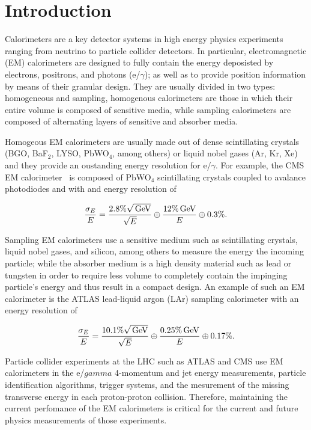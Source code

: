\section{Introduction}
Calorimeters are a key detector systems in high energy physics experiments
ranging from neutrino to particle collider detectors. In
particular, electromagnetic (EM) calorimeters are designed to fully
contain the energy deposisted by electrons, positrons, and photons (e/$\gamma$);
as well as to provide position information by means of their granular
design. They are usually divided in two types: homogeneous and
sampling, homogenous calorimeters are those in which their entire
volume is composed of sensitive media, while sampling calorimeters
are composed of alternating layers of sensitive and absorber
media. 

Homogeous EM calorimeters are usually made out of dense scintillating
crystals (BGO, BaF$_{2}$, LYSO, PbWO$_{4}$, among others) or liquid nobel gases
(Ar, Kr, Xe) and they provide an oustanding energy resolution for
e/$\gamma$. For example, the CMS EM calorimeter~\cite{cmsECAL} is
composed of PbWO$_{4}$ scintillating crystals coupled to avalance
photodiodes and with and energy resolution of

\begin{equation}
\frac{\sigma_{E}}{E} = \frac{2.8\%\sqrt{\,\text{Ge\hspace{-.08em}V}}}{\sqrt{E}} \oplus \frac{12\%\,\text{Ge\hspace{-.08em}V}}{E} \oplus 0.3\%.
\end{equation}

Sampling EM calorimeters use a sensitive medium such as
scintillating crystals, liquid nobel gases, and silicon, among others
to measure the energy the incoming particle;
while the absorber medium is a high density material such as lead or
tungsten in order to require less volume to completely contain the
impinging particle's energy and thus result in a compact design. An
example of such an EM calorimeter is the ATLAS lead-liquid argon (LAr)
sampling calorimeter with an energy resolution of

\begin{equation}
\frac{\sigma_{E}}{E} = \frac{10.1\%\sqrt{\,\text{Ge\hspace{-.08em}V}}}{\sqrt{E}} \oplus \frac{0.25\%\,\text{Ge\hspace{-.08em}V}}{E} \oplus 0.17\%.
\end{equation}

Particle collider experiments at the LHC such as ATLAS and CMS
use EM calorimeters in the e/$gamma$ 4-momentum and jet
energy measurements, particle identification algorithms,
trigger systems, and the mesurement of the missing transverse energy in
each proton-proton collision. Therefore, maintaining the current perfomance of the EM
calorimeters is critical for the current and future physics measurements of those experiments.


